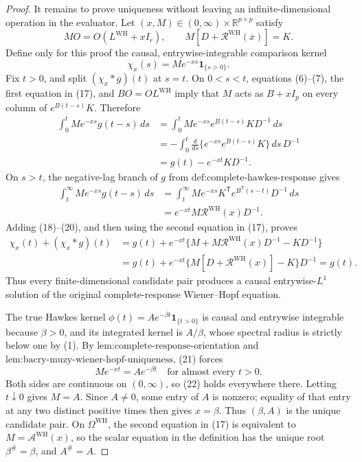 \documentclass{article}
\begin{document}
\begin{proof}
It remains to prove uniqueness without leaving an infinite-dimensional operation in the evaluator.  Let \((x,M)\in(0,\infty)\times\mathbb R^{p\times p}\) satisfy
\[
 MO=O(L^{\mathrm{WH}}+xI_r),\qquad
 M[D+\mathcal R^{\mathrm{WH}}(x)]=K.
\tag{17}
\]
Define only for this proof the causal, entrywise-integrable comparison kernel
\[
 \chi_x(s)=Me^{-xs}\mathbf 1_{\{s>0\}}.
\tag{18}
\]
Fix \(t>0\), and split \((\chi_x*g)(t)\) at \(s=t\).  On \(0<s<t\), equations (6)--(7), the first equation in (17), and \(BO=OL^{\mathrm{WH}}\) imply that \(M\) acts as \(B+xI_p\) on every column of \(e^{B(t-s)}K\).  Therefore
\[
 \begin{aligned}
 \int_0^t Me^{-xs}g(t-s)\,ds
 &=\int_0^t Me^{-xs}e^{B(t-s)}K D^{-1}\,ds\\
 &=-\int_0^t\frac{d}{ds}
   \{e^{-xs}e^{B(t-s)}K\}\,ds\,D^{-1}\\
 &=g(t)-e^{-xt}KD^{-1}.
 \end{aligned}
\tag{19}
\]
On \(s>t\), the negative-lag branch of \(g\) from \(\text{def:complete-hawkes-response}\) gives
\[
 \begin{aligned}
 \int_t^\infty Me^{-xs}g(t-s)\,ds
 &=\int_t^\infty Me^{-xs}K^{\mathsf T}e^{B^{\mathsf T}(s-t)}D^{-1}\,ds\\
 &=e^{-xt}M\mathcal R^{\mathrm{WH}}(x)D^{-1}.
 \end{aligned}
\tag{20}
\]
Adding (18)--(20), and then using the second equation in (17), proves
\[
 \begin{aligned}
 \chi_x(t)+(\chi_x*g)(t)
 &=g(t)+e^{-xt}\{M+M\mathcal R^{\mathrm{WH}}(x)D^{-1}-KD^{-1}\}\\
 &=g(t)+e^{-xt}\{M[D+\mathcal R^{\mathrm{WH}}(x)]-K\}D^{-1}=g(t).
 \end{aligned}
\tag{21}
\]
Thus every finite-dimensional candidate pair produces a causal entrywise-\(L^1\) solution of the original complete-response Wiener--Hopf equation.

The true Hawkes kernel \(\phi(t)=Ae^{-\beta t}\mathbf 1_{\{t>0\}}\) is causal and entrywise integrable because \(\beta>0\), and its integrated kernel is \(A/\beta\), whose spectral radius is strictly below one by (1).  By \(\text{lem:complete-response-orientation}\) and \(\text{lem:bacry-muzy-wiener-hopf-uniqueness}\), (21) forces
\[
 Me^{-xt}=Ae^{-\beta t}\quad\text{for almost every }t>0.
\tag{22}
\]
Both sides are continuous on \((0,\infty)\), so (22) holds everywhere there.  Letting \(t\downarrow0\) gives \(M=A\).  Since \(A\neq0\), some entry of \(A\) is nonzero; equality of that entry at any two distinct positive times then gives \(x=\beta\).  Thus \((\beta,A)\) is the unique candidate pair.  On \(\Omega^{\mathrm{WH}}\), the second equation in (17) is equivalent to \(M=\mathcal A^{\mathrm{WH}}(x)\), so the scalar equation in the definition has the unique root \(\beta^{\#}=\beta\), and \(A^{\#}=A\).


\end{proof}
\end{document}
